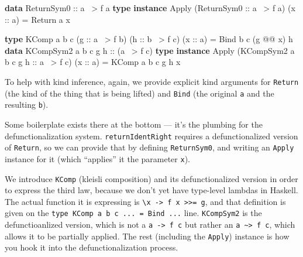 \documentclass[]{article}
\newenvironment{Shaded}{}{}
\newcommand{\KeywordTok}[1]{\textcolor[rgb]{0.00,0.44,0.13}{\textbf{{#1}}}}
\newcommand{\DataTypeTok}[1]{\textcolor[rgb]{0.56,0.13,0.00}{{#1}}}
\newcommand{\OtherTok}[1]{\textcolor[rgb]{0.00,0.44,0.13}{{#1}}}
\newcommand{\FunctionTok}[1]{\textcolor[rgb]{0.02,0.16,0.49}{{#1}}}
\newcommand{\NormalTok}[1]{{#1}}
\begin{document}
\begin{Shaded}
\begin{Highlighting}[]
\KeywordTok{data} \DataTypeTok{ReturnSym0}\OtherTok{ ::} \NormalTok{a }\FunctionTok{~>} \NormalTok{f a}
\KeywordTok{type} \KeywordTok{instance} \DataTypeTok{Apply} \NormalTok{(}\DataTypeTok{ReturnSym0}\OtherTok{ ::} \NormalTok{a }\FunctionTok{~>} \NormalTok{f a) (}\OtherTok{x ::} \NormalTok{a) }\FunctionTok{=} \DataTypeTok{Return} \NormalTok{a x}

\KeywordTok{type} \DataTypeTok{KComp} \NormalTok{a b c (}\OtherTok{g ::} \NormalTok{a }\FunctionTok{~>} \NormalTok{f b) (}\OtherTok{h ::} \NormalTok{b }\FunctionTok{~>} \NormalTok{f c) (}\OtherTok{x ::} \NormalTok{a) }\FunctionTok{=} \DataTypeTok{Bind} \NormalTok{b c (g }\FunctionTok{@@} \NormalTok{x) h}
\KeywordTok{data} \DataTypeTok{KCompSym2} \NormalTok{a b c g}\OtherTok{ h ::} \NormalTok{(a }\FunctionTok{~>} \NormalTok{f c)}
\KeywordTok{type} \KeywordTok{instance} \DataTypeTok{Apply} \NormalTok{(}\DataTypeTok{KCompSym2} \NormalTok{a b c g}\OtherTok{ h ::} \NormalTok{a }\FunctionTok{~>} \NormalTok{f c) (}\OtherTok{x ::} \NormalTok{a) }\FunctionTok{=} \DataTypeTok{KComp} \NormalTok{a b c g h x}
\end{Highlighting}
\end{Shaded}

To help with kind inference, again, we provide explicit kind arguments for
\texttt{Return} (the kind of the thing that is being lifted) and \texttt{Bind}
(the original \texttt{a} and the resulting \texttt{b}).

Some boilerplate exists there at the bottom --- it's the plumbing for the
defunctionalization system. \texttt{returnIdentRight} requires a
defunctionalized version of \texttt{Return}, so we can provide that by defining
\texttt{ReturnSym0}, and writing an \texttt{Apply} instance for it (which
``applies'' it the parameter \texttt{x}).

We introduce \texttt{KComp} (kleisli composition) and its defunctionalized
version in order to express the third law, because we don't yet have type-level
lambdas in Haskell. The actual function it is expressing is
\texttt{\textbackslash{}x\ -\textgreater{}\ f\ x\ \textgreater{}\textgreater{}=\ g},
and that definition is given on the
\texttt{type\ KComp\ a\ b\ c\ ...\ =\ Bind\ ...} line. \texttt{KCompSym2} is the
defunctioanlized version, which is not a \texttt{a\ -\textgreater{}\ f\ c} but
rather an \texttt{a\ \textasciitilde{}\textgreater{}\ f\ c}, which allows it to
be partially applied. The rest (including the \texttt{Apply}) instance is how
you hook it into the defunctionalization process.
\end{document}
